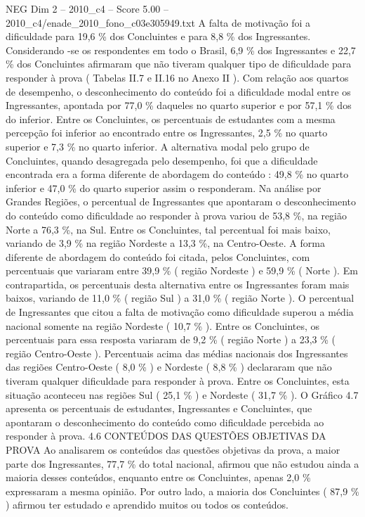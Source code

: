 \begin{textsample}{NEG Dim 2 – 2010\_c4 – Score 5.00 – 2010\_c4/enade\_2010\_fono\_c03e305949.txt}
A falta de motivação foi a dificuldade para 19,6 \% dos Concluintes e para 8,8 \% dos Ingressantes.
Considerando -se os respondentes em todo o Brasil, 6,9 \% dos Ingressantes e 22,7 \% dos Concluintes afirmaram que não tiveram qualquer tipo de dificuldade para responder à prova ( Tabelas II.7 e II.16 no Anexo II ).
Com relação aos quartos de desempenho, o desconhecimento do conteúdo foi a dificuldade modal entre os Ingressantes, apontada por 77,0 \% daqueles no quarto superior e por 57,1 \% dos do inferior.
Entre os Concluintes, os percentuais de estudantes com a mesma percepção foi inferior ao encontrado entre os Ingressantes, 2,5 \% no quarto superior e 7,3 \% no quarto inferior.
A alternativa modal pelo grupo de Concluintes, quando desagregada pelo desempenho, foi que a dificuldade encontrada era a forma diferente de abordagem do conteúdo : 49,8 \% no quarto inferior e 47,0 \% do quarto superior assim o responderam.
Na análise por Grandes Regiões, o percentual de Ingressantes que apontaram o desconhecimento do conteúdo como dificuldade ao responder à prova variou de 53,8 \%, na região Norte a 76,3 \%, na Sul.
Entre os Concluintes, tal percentual foi mais baixo, variando de 3,9 \% na região Nordeste a 13,3 \%, na Centro-Oeste.
A forma diferente de abordagem do conteúdo foi citada, pelos Concluintes, com percentuais que variaram entre 39,9 \% ( região Nordeste ) e 59,9 \% ( Norte ).
Em contrapartida, os percentuais desta alternativa entre os Ingressantes foram mais baixos, variando de 11,0 \% ( região Sul ) a 31,0 \% ( região Norte ).
O percentual de Ingressantes que citou a falta de motivação como dificuldade superou a média nacional somente na região Nordeste ( 10,7 \% ).
Entre os Concluintes, os percentuais para essa resposta variaram de 9,2 \% ( região Norte ) a 23,3 \% ( região Centro-Oeste ).
Percentuais acima das médias nacionais dos Ingressantes das regiões Centro-Oeste ( 8,0 \% ) e Nordeste ( 8,8 \% ) declararam que não tiveram qualquer dificuldade para responder à prova.
Entre os Concluintes, esta situação aconteceu nas regiões Sul ( 25,1 \% ) e Nordeste ( 31,7 \% ).
O Gráfico 4.7 apresenta os percentuais de estudantes, Ingressantes e Concluintes, que apontaram o desconhecimento do conteúdo como dificuldade percebida ao responder à prova. 4.6 CONTEÚDOS DAS QUESTÕES OBJETIVAS DA PROVA Ao analisarem os conteúdos das questões objetivas da prova, a maior parte dos Ingressantes, 77,7 \% do total nacional, afirmou que não estudou ainda a maioria desses conteúdos, enquanto entre os Concluintes, apenas 2,0 \% expressaram a mesma opinião.
Por outro lado, a maioria dos Concluintes ( 87,9 \% ) afirmou ter estudado e aprendido muitos ou todos os conteúdos.

\end{textsample}
